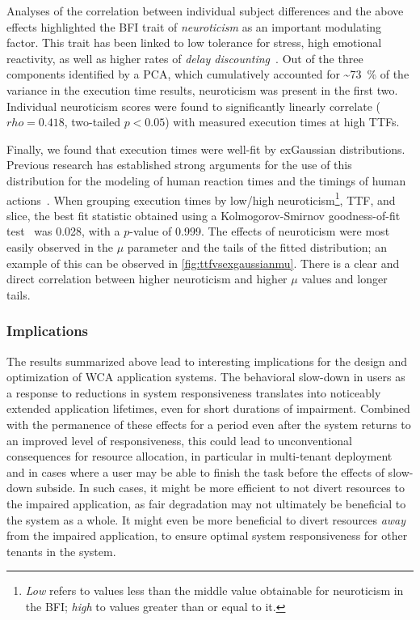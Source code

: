 Analyses of the correlation between individual subject differences and the above effects highlighted the \gls{BFI} trait of \emph{neuroticism} as an important modulating factor.
This trait has been linked to low tolerance for stress, high emotional reactivity, as well as higher rates of \emph{delay discounting}~\cite{hirsh2008delay}.
Out of the three components identified by a \gls{PCA}, which cumulatively accounted for \textasciitilde\SI{73}{\percent} of the variance in the execution time results, neuroticism was present in the first two.
Individual neuroticism scores were found to significantly linearly correlate (\ensuremath{rho = 0.418}, two-tailed \ensuremath{p < 0.05}) with measured execution times at high \glspl{TTF}.

Finally, we found that execution times were well-fit by \gls{exGaussian} distributions.
Previous research has established strong arguments for the use of this distribution for the modeling of human reaction times and the timings of human actions~\cite{rohrer1994analysis,palmer2011what,marmolejo_ramos2022generalised}.
When grouping execution times by low/high neuroticism\footnote{%
    \emph{Low} refers to values less than the middle value obtainable for neuroticism in the \gls{BFI}; \emph{high} to values greater than or equal to it.
}, \gls{TTF}, and slice, the best fit statistic obtained using a Kolmogorov-Smirnov goodness-of-fit test~\cite{massey_jr1951kolmogorov} was \num{0.028}, with a \ensuremath{p}-value of \num{0.999}.
The effects of neuroticism were most easily observed in the \ensuremath{\mu} parameter and the tails of the fitted distribution;
an example of this can be observed in \cref{fig:ttfvsexgaussianmu}.
There is a clear and direct correlation between higher neuroticism and higher \ensuremath{\mu} values and longer tails.

\subsubsection{Implications}

The results summarized above lead to interesting implications for the design and optimization of \gls{WCA} application systems.
The behavioral slow-down in users as a response to reductions in system responsiveness translates into noticeably extended application lifetimes, even for short durations of impairment.
Combined with the permanence of these effects for a period even after the system returns to an improved level of responsiveness, this could lead to unconventional consequences for resource allocation, in particular in multi-tenant deployment and in cases where a user may be able to finish the task before the effects of slow-down subside.
In such cases, it might be more efficient to not divert resources to the impaired application, as fair degradation may not ultimately be beneficial to the system as a whole.
It might even be more beneficial to divert resources \emph{away} from the impaired application, to ensure optimal system responsiveness for other tenants in the system.

